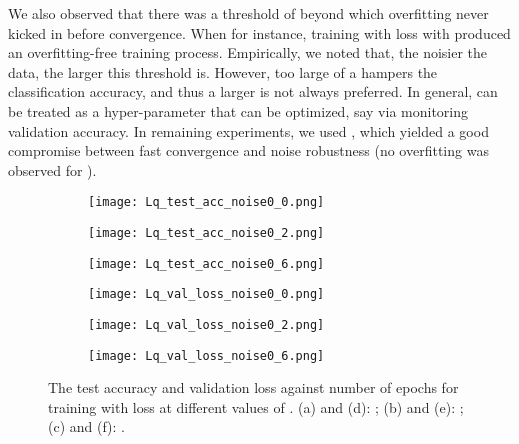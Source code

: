 \documentclass{article}
\begin{document}
We also observed that there was a threshold of  beyond which overfitting never kicked in before convergence. 
When  for instance, training with  loss with  produced an overfitting-free training process. Empirically, we noted that, the noisier the data, the larger this threshold is. 
However, too large of a  hampers the classification accuracy, and thus a larger  is not always preferred. 
In general,  can be treated as a hyper-parameter that can be optimized, say via monitoring validation accuracy.
In remaining experiments, we used , which yielded a good compromise between fast convergence and noise robustness (no overfitting was observed for ). 
\begin{figure}
\centering
\begin{subfigure}{.31\textwidth}
\centering
\texttt{[image: Lq\_test\_acc\_noise0\_0.png]}
\caption{}
\end{subfigure}
\begin{subfigure}{.31\textwidth}
\centering
\texttt{[image: Lq\_test\_acc\_noise0\_2.png]}
\caption{}
\end{subfigure}
\begin{subfigure}{.31\textwidth}
\centering
\texttt{[image: Lq\_test\_acc\_noise0\_6.png]}
\caption{}
\end{subfigure}
\begin{subfigure}{.31\textwidth}
\centering
\texttt{[image: Lq\_val\_loss\_noise0\_0.png]}
\caption{}
\end{subfigure}
\begin{subfigure}{.31\textwidth}
\centering
\texttt{[image: Lq\_val\_loss\_noise0\_2.png]}
\caption{}
\end{subfigure}
\begin{subfigure}{.31\textwidth}
\centering
\texttt{[image: Lq\_val\_loss\_noise0\_6.png]}
\caption{}
\end{subfigure}
\caption{The test accuracy and validation loss against number of epochs for training with  loss at different values of . (a) and (d): ; (b) and (e): ; (c) and (f): . }
\label{Lq_diff_q}
\end{figure}
\end{document}
